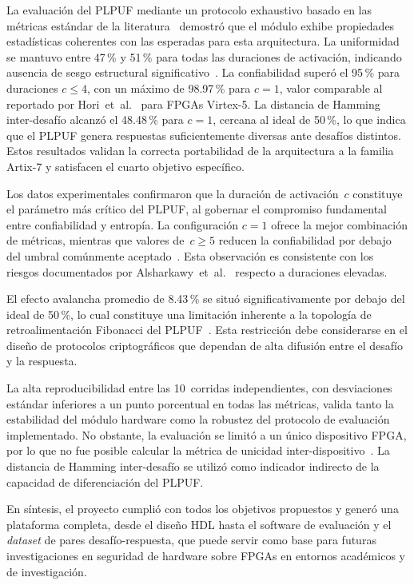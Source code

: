 La evaluación del PLPUF mediante un protocolo exhaustivo basado en las
métricas estándar de la
literatura~\cite{hori_2011_pseudolfsr, maiti_2012_systematic} demostró que el
módulo exhibe propiedades estadísticas coherentes con las esperadas para esta
arquitectura. La uniformidad se mantuvo entre 47\,\% y 51\,\% para todas las
duraciones de activación, indicando ausencia de sesgo estructural
significativo~\cite{maiti_2012_systematic}. La confiabilidad superó el 95\,\%
para duraciones $c \leq 4$, con un máximo de 98.97\,\% para $c = 1$, valor
comparable al reportado por Hori~et~al.~\cite{hori_2011_pseudolfsr} para
FPGAs Virtex-5. La distancia de Hamming inter-desafío alcanzó el 48.48\,\%
para $c = 1$, cercana al ideal de 50\,\%, lo que indica que el PLPUF genera
respuestas suficientemente diversas ante desafíos distintos. Estos resultados
validan la correcta portabilidad de la arquitectura a la familia Artix-7 y
satisfacen el cuarto objetivo específico.

Los datos experimentales confirmaron que la duración de activación~$c$
constituye el parámetro más crítico del PLPUF, al gobernar el compromiso
fundamental entre confiabilidad y entropía. La configuración $c = 1$ ofrece la
mejor combinación de métricas, mientras que valores de~$c \geq 5$ reducen la
confiabilidad por debajo del umbral comúnmente
aceptado~\cite{maiti_2012_systematic}. Esta observación es consistente con los
riesgos documentados por Alsharkawy~et~al.~\cite{alsharkawy_2024_plpufs}
respecto a duraciones elevadas.

El efecto avalancha promedio de 8.43\,\% se situó significativamente por
debajo del ideal de 50\,\%, lo cual constituye una limitación inherente a la
topología de retroalimentación Fibonacci del
PLPUF~\cite{alsharkawy_2024_plpufs}. Esta restricción debe considerarse en
el diseño de protocolos criptográficos que dependan de alta difusión entre el
desafío y la respuesta.

La alta reproducibilidad entre las 10~corridas independientes, con
desviaciones estándar inferiores a un punto porcentual en todas las métricas,
valida tanto la estabilidad del módulo hardware como la robustez del protocolo
de evaluación implementado. No obstante, la evaluación se limitó a un único
dispositivo FPGA, por lo que no fue posible calcular la métrica de unicidad
inter-dispositivo~\cite{wilde_2020_confidence}. La distancia de Hamming
inter-desafío se utilizó como indicador indirecto de la capacidad de
diferenciación del PLPUF.

En síntesis, el proyecto cumplió con todos los objetivos propuestos y generó
una plataforma completa, desde el diseño HDL hasta el software de evaluación
y el \textit{dataset} de pares desafío-respuesta, que puede servir como base
para futuras investigaciones en seguridad de hardware sobre FPGAs en entornos
académicos y de investigación.

